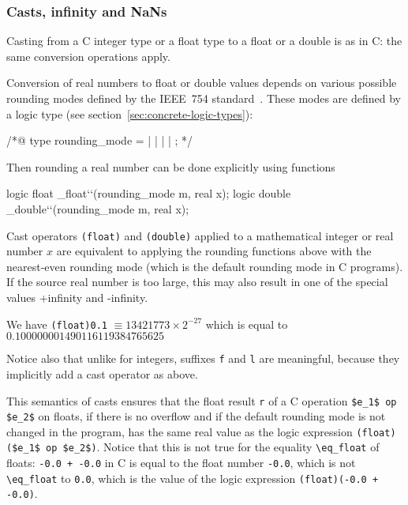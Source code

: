 \subsubsection{Casts, infinity and NaNs}

Casting from a C integer type or a float type to a float
or a double is as in C: the same conversion operations apply.

Conversion of real numbers to float or double values depends on
various possible rounding modes defined by the IEEE~754
standard~\cite{float-std,wikipedia-float}. These modes are defined by
a logic type (see section~\ref{sec:concrete-logic-types}):
\begin{listing-nonumber}
/*@ type rounding_mode = \Up | \Down | \ToZero | \NearestAway | \NearestEven;
*/
\end{listing-nonumber}
Then rounding a real number can be done explicitly using functions
\begin{listing-nonumber}
  logic float \round_float``(rounding_mode m, real x);
  logic double \round_double``(rounding_mode m, real x);
\end{listing-nonumber}
Cast operators \lstinline|(float)| and \lstinline|(double)| applied to a
mathematical integer or real number $x$ are equivalent to applying the
rounding functions above with the nearest-even rounding mode (which is
the default rounding mode in C programs).
If the source real number is too large, this may also result in one
of the special values +infinity and -infinity.
\begin{example}
  We have
  \lstinline|(float)0.1| $\equiv 13421773 \times 2 ^{-27}$ which is equal to
  $0.100000001490116119384765625$
\end{example}
Notice also that unlike for integers, suffixes \lstinline|f| and
\lstinline|l| are
meaningful, because they implicitly add a cast operator as above.

This semantics of casts ensures that the float result \lstinline|r| of
a C operation \lstinline|$e_1$ op $e_2$| on floats, if there is no
overflow and if the default
rounding mode is not changed in the program, has the same real value
as the logic expression \lstinline|(float)($e_1$ op $e_2$)|. Notice
that this is not
true for the equality \lstinline|\eq_float| of floats: \lstinline|-0.0 + -0.0|
in C is equal to the float number \lstinline|-0.0|, which is not
\lstinline|\eq_float| to \lstinline|0.0|, which is the value of the logic
expression \lstinline|(float)(-0.0 + -0.0)|.

